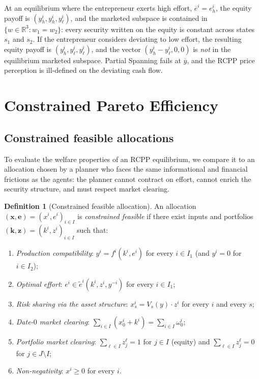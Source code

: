 \documentclass[11pt,a4paper,oneside]{book}
\def\R{\mathbb{R}}
\def\geq{\geqslant}
\theoremstyle{plain}
\theoremstyle{definition}
\newtheorem{definition}[theorem]{Definition}
\theoremstyle{remark}
\numberwithin{equation}{chapter}
\begin{document}
At an equilibrium where the entrepreneur exerts high effort, $\overline{e}^i = e^i_h$, the equity payoff is $(y^i_h, y^i_h, y^i_\ell)$, and the marketed subspace is contained in $\{ w \in \R^3 \colon w_1 = w_2 \}$: every security written on the equity is constant across states $s_1$ and $s_2$.
If the entrepreneur considers deviating to low effort, the resulting equity payoff is $(y^i_h, y^i_\ell, y^i_\ell)$, and the vector $(y^i_h - y^i_\ell, 0, 0)$ is \emph{not} in the equilibrium marketed subspace.
Partial Spanning fails at $\overline{y}$, and the RCPP price perception is ill-defined on the deviating cash flow.

\section{Constrained Pareto Efficiency}
\label{sec:MH-CPO}

\subsection{Constrained feasible allocations}

To evaluate the welfare properties of an RCPP equilibrium, we compare it to an allocation chosen by a planner who faces the same informational and financial frictions as the agents: the planner cannot contract on effort, cannot enrich the security structure, and must respect market clearing.

\begin{definition}[Constrained feasible allocation]\label{def:MH-feasible}
An allocation $(\bm{x}, \bm{e}) = (x^i, e^i)_{i \in I}$ is \emph{constrained feasible} if there exist inputs and portfolios $(\bm{k}, \bm{z}) = (k^i, z^i)_{i \in I}$ such that:
\begin{enumerate}
  \item[(i)] \emph{Production compatibility}: $y^i = f^i(k^i, e^i)$ for every $i \in I_1$ (and $y^i = 0$ for $i \in I_2$);
  \item[(ii)] \emph{Optimal effort}: $e^i \in \widetilde{e}^i(k^i, z^i, y^{-i})$ for every $i \in I_1$;
  \item[(iii)] \emph{Risk sharing via the asset structure}: $x^i_s = V_s(y) \cdot z^i$ for every $i$ and every $s$;
  \item[(iv)] \emph{Date-$0$ market clearing}: $\sum_{i \in I} (x^i_0 + k^i) = \sum_{i \in I} \omega^i_0$;
  \item[(v)] \emph{Portfolio market clearing}: $\sum_{\ell \in I} z^\ell_j = 1$ for $j \in I$ (equity) and $\sum_{\ell \in I} z^\ell_j = 0$ for $j \in J \setminus I$;
  \item[(vi)] \emph{Non-negativity}: $x^i \geq 0$ for every $i$.
\end{enumerate}
\end{definition}
\end{document}
